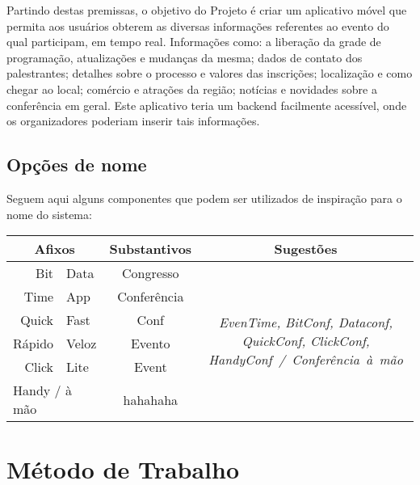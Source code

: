 \documentclass[a4paper]{abntex2}
\begin{document}
Partindo destas premissas, o objetivo do Projeto é criar um aplicativo móvel que permita aos usuários obterem as diversas informações referentes ao evento do qual participam, em tempo real. Informações como: a liberação da grade de programação, atualizações e mudanças da mesma; dados de contato dos palestrantes; detalhes sobre o processo e valores das inscrições; localização e como chegar ao local; comércio e atrações da região; notícias e novidades sobre a conferência em geral. Este aplicativo teria um backend facilmente acessível, onde os organizadores poderiam inserir tais informações.


\subsection*{Opções de nome}

Seguem aqui alguns componentes que podem ser utilizados de inspiração para o nome do sistema:\\

\begin{tabular}{rl|c|c}
\multicolumn{2}{c|}{\textbf{Afixos}} & \textbf{Substantivos} & \textbf{Sugestões} \\\hline
Bit		& Data	& Congresso		& \multirow{6}{5cm}{\emph{EvenTime, BitConf, Dataconf, QuickConf, ClickConf, HandyConf~/~Conferência~à~mão}} \\\cline{1-3}
Time	& App	& Conferência	& \\\cline{1-3}
Quick	& Fast	& Conf			& \\\cline{1-3}
Rápido	& Veloz	& Evento		& \\\cline{1-3}
Click	& Lite	& Event			& \\\cline{1-3}
\multicolumn{2}{l|}{Handy / à mão}	& hahahaha		& \\
\end{tabular}


\section{Método de Trabalho}



\end{document}
